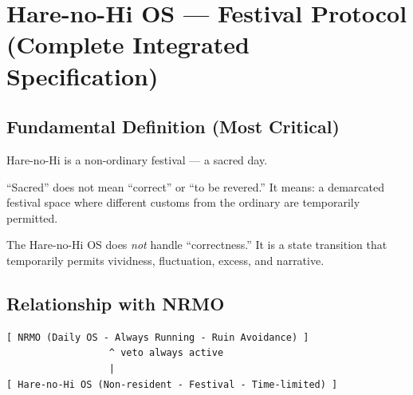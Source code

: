 
\chapter{Hare-no-Hi OS --- Festival Protocol
(Complete Integrated Specification)}
\label{ch:hare-no-hi}


\section{Fundamental Definition (Most Critical)}
\label{sec:hare-definition}

Hare-no-Hi is a non-ordinary festival --- a sacred day.

``Sacred'' does not mean ``correct'' or ``to be revered.'' It means:
a demarcated festival space where different customs from the
ordinary are temporarily permitted.


The Hare-no-Hi OS does \emph{not} handle ``correctness.'' It is a
state transition that temporarily permits vividness, fluctuation,
excess, and narrative.

\section{Relationship with NRMO}
\label{sec:hare-vs-nrmo}

\begin{verbatim}
[ NRMO (Daily OS - Always Running - Ruin Avoidance) ]
                  ^ veto always active
                  |
[ Hare-no-Hi OS (Non-resident - Festival - Time-limited) ]
\end{verbatim}

